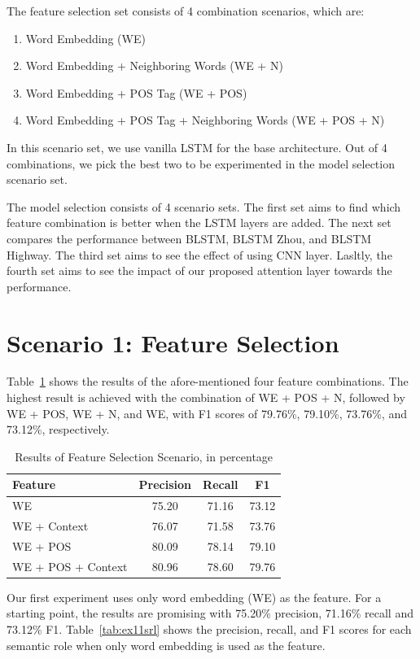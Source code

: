 The feature selection set consists of 4 combination scenarios, which are:
\begin{enumerate}
	\item Word Embedding (WE)
	\item Word Embedding + Neighboring Words (WE + N)
	\item Word Embedding + POS Tag (WE + POS)
	\item Word Embedding + POS Tag + Neighboring Words (WE + POS + N)
\end{enumerate}

In this scenario set, we use vanilla LSTM for the base architecture. Out of 4 combinations, we pick the best two to be experimented in the model selection scenario set.

The model selection consists of 4 scenario sets. The first set aims to find which feature combination is better when the LSTM layers are added. The next set compares the performance between BLSTM, BLSTM Zhou, and BLSTM Highway. The third set aims to see the effect of using CNN layer. Lasltly, the fourth set aims to see the impact of our proposed attention layer towards the performance.

\section{Scenario 1: Feature Selection}
Table~\ref{tab:feature_scenario} shows the results of the afore-mentioned four feature combinations. The highest result is achieved with the combination of WE + POS + N, followed by WE + POS, WE + N, and WE, with F1 scores of 79.76\%, 79.10\%, 73.76\%, and 73.12\%, respectively. 

\begin{table}
	\centering
	\caption{Results of Feature Selection Scenario, in percentage}
	\label{tab:feature_scenario}
	\begin{tabular}{lccc}
		\hline
		Feature & Precision & Recall & F1 \\
		\hline\hline
		WE & 75.20 & 71.16 & 73.12 \\
		WE + Context & 76.07 & 71.58 & 73.76 \\
		WE + POS & 80.09 & 78.14 & 79.10 \\
		WE + POS + Context & 80.96 & 78.60 & 79.76 \\
		\hline
	\end{tabular}

\end{table}

Our first experiment uses only word embedding (WE) as the feature. For a starting point, the results are promising with 75.20\% precision, 71.16\% recall and 73.12\% F1. Table~\ref{tab:ex11srl} shows the precision, recall, and F1 scores for each semantic role when only word embedding is used as the feature.

